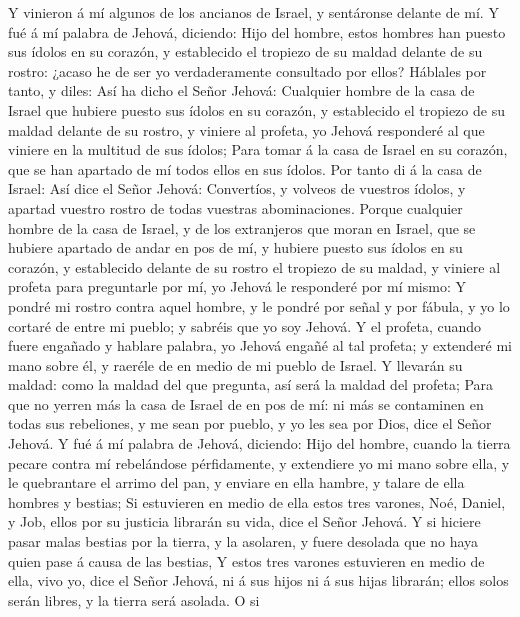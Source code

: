  Y vinieron á mí algunos de los ancianos de Israel, y
sentáronse delante de mí.  Y fué á mí palabra de Jehová,
diciendo:  Hijo del hombre, estos hombres han puesto sus
ídolos en su corazón, y establecido el tropiezo de su maldad delante de
su rostro: ¿acaso he de ser yo verdaderamente consultado por ellos?
 Háblales por tanto, y diles: Así ha dicho el Señor Jehová:
Cualquier hombre de la casa de Israel que hubiere puesto sus ídolos en
su corazón, y establecido el tropiezo de su maldad delante de su rostro,
y viniere al profeta, yo Jehová responderé al que viniere en la multitud
de sus ídolos;  Para tomar á la casa de Israel en su
corazón, que se han apartado de mí todos ellos en sus ídolos.
 Por tanto di á la casa de Israel: Así dice el Señor Jehová:
Convertíos, y volveos de vuestros ídolos, y apartad vuestro rostro de
todas vuestras abominaciones.  Porque cualquier hombre de la
casa de Israel, y de los extranjeros que moran en Israel, que se hubiere
apartado de andar en pos de mí, y hubiere puesto sus ídolos en su
corazón, y establecido delante de su rostro el tropiezo de su maldad, y
viniere al profeta para preguntarle por mí, yo Jehová le responderé por
mí mismo:  Y pondré mi rostro contra aquel hombre, y le
pondré por señal y por fábula, y yo lo cortaré de entre mi pueblo; y
sabréis que yo soy Jehová.  Y el profeta, cuando fuere
engañado y hablare palabra, yo Jehová engañé al tal profeta; y extenderé
mi mano sobre él, y raeréle de en medio de mi pueblo de Israel.
 Y llevarán su maldad: como la maldad del que pregunta, así
será la maldad del profeta;  Para que no yerren más la casa
de Israel de en pos de mí: ni más se contaminen en todas sus rebeliones,
y me sean por pueblo, y yo les sea por Dios, dice el Señor Jehová.
 Y fué á mí palabra de Jehová, diciendo:  Hijo
del hombre, cuando la tierra pecare contra mí rebelándose pérfidamente,
y extendiere yo mi mano sobre ella, y le quebrantare el arrimo del pan,
y enviare en ella hambre, y talare de ella hombres y bestias;
 Si estuvieren en medio de ella estos tres varones, Noé,
Daniel, y Job, ellos por su justicia librarán su vida, dice el Señor
Jehová.  Y si hiciere pasar malas bestias por la tierra, y
la asolaren, y fuere desolada que no haya quien pase á causa de las
bestias,  Y estos tres varones estuvieren en medio de ella,
vivo yo, dice el Señor Jehová, ni á sus hijos ni á sus hijas librarán;
ellos solos serán libres, y la tierra será asolada.  O si

